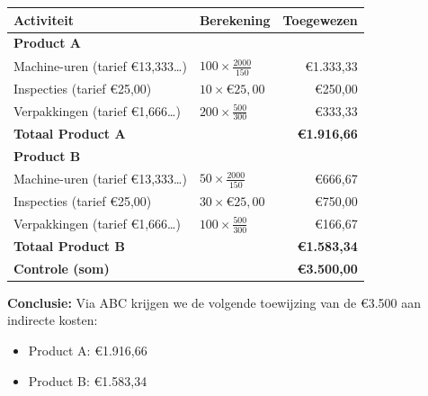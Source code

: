 \documentclass[a4paper,11pt]{article}
\begin{document}
\begin{oefenblok}
    \begin{tabular}{llr}
        \hline
        \textbf{Activiteit}                           & \textbf{Berekening}         & \textbf{Toegewezen}  \\
        \hline
        \multicolumn{3}{l}{\textbf{Product A}}                                                              \\
        Machine-uren (tarief €13,333\dots)            & $100 \times \frac{2000}{150}$      & €1.333,33            \\
        Inspecties (tarief €25,00)                    & $10 \times €25{,}00$        & €250,00              \\
        Verpakkingen (tarief €1,666\dots)             & $200 \times \frac{500}{300}$       & €333,33              \\
        \hline
        \textbf{Totaal Product A}                     &                             & \textbf{€1.916,66}   \\
        \hline
        \multicolumn{3}{l}{\textbf{Product B}}                                                              \\
        Machine-uren (tarief €13,333\dots)            & $50 \times \frac{2000}{150}$       & €666,67              \\
        Inspecties (tarief €25,00)                    & $30 \times €25{,}00$        & €750,00              \\
        Verpakkingen (tarief €1,666\dots)             & $100 \times \frac{500}{300}$       & €166,67              \\
        \hline
        \textbf{Totaal Product B}                     &                             & \textbf{€1.583,34}   \\
        \hline
        \textbf{Controle (som)}                       &                             & \textbf{€3.500,00}   \\
        \hline
    \end{tabular}

    \vspace{2mm}
    \textbf{Conclusie:} Via ABC krijgen we de volgende toewijzing van de €3.500 aan indirecte kosten:
    \begin{itemize}
        \item Product A: €1.916,66
        \item Product B: €1.583,34
    \end{itemize}

\end{oefenblok}
\end{document}
